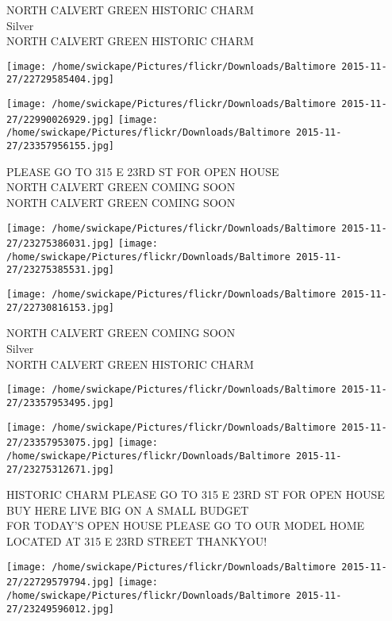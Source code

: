 \documentclass[10pt,letterpaper]{article}
\begin{document}
NORTH CALVERT GREEN HISTORIC CHARM\\
Silver\\
NORTH CALVERT GREEN HISTORIC CHARM
\pagebreak

\texttt{[image: /home/swickape/Pictures/flickr/Downloads/Baltimore 2015-11-27/22729585404.jpg]}

\vspace{0.25in}
\texttt{[image: /home/swickape/Pictures/flickr/Downloads/Baltimore 2015-11-27/22990026929.jpg]}
\texttt{[image: /home/swickape/Pictures/flickr/Downloads/Baltimore 2015-11-27/23357956155.jpg]}

PLEASE GO TO 315 E 23RD ST FOR OPEN HOUSE\\
NORTH CALVERT GREEN COMING SOON\\
NORTH CALVERT GREEN COMING SOON
\pagebreak

\texttt{[image: /home/swickape/Pictures/flickr/Downloads/Baltimore 2015-11-27/23275386031.jpg]}
\texttt{[image: /home/swickape/Pictures/flickr/Downloads/Baltimore 2015-11-27/23275385531.jpg]}

\texttt{[image: /home/swickape/Pictures/flickr/Downloads/Baltimore 2015-11-27/22730816153.jpg]}

NORTH CALVERT GREEN COMING SOON\\
Silver\\
NORTH CALVERT GREEN HISTORIC CHARM
\pagebreak

\texttt{[image: /home/swickape/Pictures/flickr/Downloads/Baltimore 2015-11-27/23357953495.jpg]}

\vspace{0.25in}
\texttt{[image: /home/swickape/Pictures/flickr/Downloads/Baltimore 2015-11-27/23357953075.jpg]}
\texttt{[image: /home/swickape/Pictures/flickr/Downloads/Baltimore 2015-11-27/23275312671.jpg]}

HISTORIC CHARM PLEASE GO TO 315 E 23RD ST FOR OPEN HOUSE\\
BUY HERE LIVE BIG ON A SMALL BUDGET\\
FOR TODAY'S OPEN HOUSE PLEASE GO TO OUR MODEL HOME LOCATED AT 315 E 23RD STREET THANKYOU!
\pagebreak

\texttt{[image: /home/swickape/Pictures/flickr/Downloads/Baltimore 2015-11-27/22729579794.jpg]}
\texttt{[image: /home/swickape/Pictures/flickr/Downloads/Baltimore 2015-11-27/23249596012.jpg]}
\end{document}
